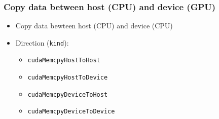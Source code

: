 \begin{frame}
   \frametitle{Copy data between host (CPU) and device (GPU)}
       \begin{itemize}
          \item Copy data bewteen host (CPU) and device (CPU) \\		       
                
  	  \item Direction (\lstinline[style=MyCudaStyle]|kind|):
             \begin{itemize}
	        \item \lstinline[style=MyCudaStyle]|cudaMemcpyHostToHost|		     
                \item \lstinline[style=MyCudaStyle]|cudaMemcpyHostToDevice|
	        \item \lstinline[style=MyCudaStyle]|cudaMemcpyDeviceToHost|
	        \item \lstinline[style=MyCudaStyle]|cudaMemcpyDeviceToDevice|		
             \end{itemize}			     
       \end{itemize}		  
\end{frame} 

\begin{frame}
   
\end{frame}


